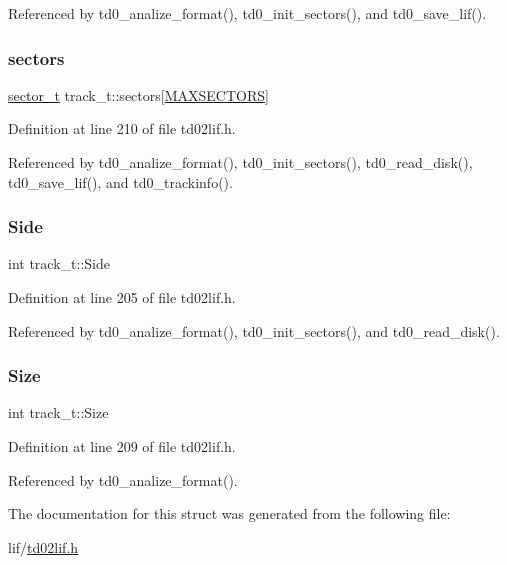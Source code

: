Referenced by td0\+\_\+analize\+\_\+format(), td0\+\_\+init\+\_\+sectors(), and td0\+\_\+save\+\_\+lif().

\mbox{\label{structtrack__t_af5a5bc7c09b032d06fe21a18f08772db}} 
\subsubsection{\texorpdfstring{sectors}{sectors}}
{\footnotesize\ttfamily \hyperlink{structsector__t}{sector\+\_\+t} track\+\_\+t\+::sectors\mbox{[}\hyperlink{td02lif_8h_a39ad5a6dea9e9b9d5314d32f397fee7d}{M\+A\+X\+S\+E\+C\+T\+O\+RS}\mbox{]}}



Definition at line 210 of file td02lif.\+h.



Referenced by td0\+\_\+analize\+\_\+format(), td0\+\_\+init\+\_\+sectors(), td0\+\_\+read\+\_\+disk(), td0\+\_\+save\+\_\+lif(), and td0\+\_\+trackinfo().

\mbox{\label{structtrack__t_ad8ed890a8194525d7162dee414180635}} 
\subsubsection{\texorpdfstring{Side}{Side}}
{\footnotesize\ttfamily int track\+\_\+t\+::\+Side}



Definition at line 205 of file td02lif.\+h.



Referenced by td0\+\_\+analize\+\_\+format(), td0\+\_\+init\+\_\+sectors(), and td0\+\_\+read\+\_\+disk().

\mbox{\label{structtrack__t_ab0e996e402d1d61b694b80a1c866177e}} 
\subsubsection{\texorpdfstring{Size}{Size}}
{\footnotesize\ttfamily int track\+\_\+t\+::\+Size}



Definition at line 209 of file td02lif.\+h.



Referenced by td0\+\_\+analize\+\_\+format().



The documentation for this struct was generated from the following file\+:\begin{DoxyCompactItemize}
\item 
lif/\hyperlink{td02lif_8h}{td02lif.\+h}\end{DoxyCompactItemize}
